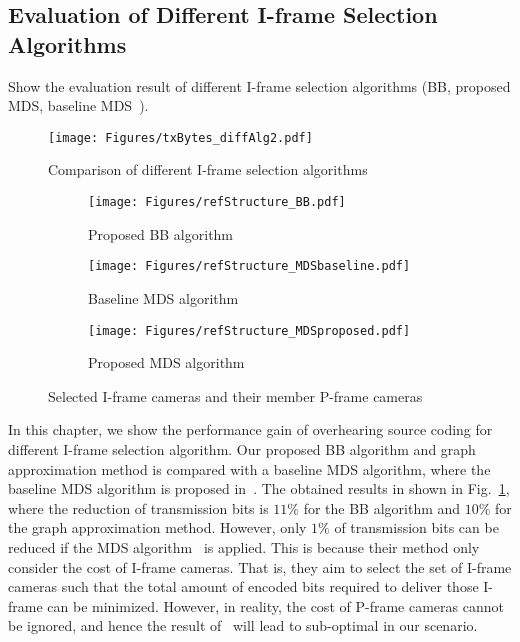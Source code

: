 \subsection{Evaluation of Different I-frame Selection Algorithms}
{\color{red}Show the evaluation result of different I-frame selection algorithms (BB, proposed MDS, baseline MDS~\cite{MWDS_baseline}).}
%
\begin{figure}
\begin{center}
\texttt{[image: Figures/txBytes\_diffAlg2.pdf]}
\caption{\label{fig::txBytes_diffAlg} Comparison of different I-frame selection algorithms}
\end{center}
\end{figure}
%
\begin{figure}
\begin{center}
%
\begin{subfigure}[b]{\columnwidth}
\texttt{[image: Figures/refStructure\_BB.pdf]}
\caption{\label{fig::refStructure_BB} Proposed BB algorithm}
\end{subfigure}
%
\begin{subfigure}[b]{\columnwidth}
\texttt{[image: Figures/refStructure\_MDSbaseline.pdf]}
\caption{\label{fig::refStructure_MDSbaseline} Baseline MDS algorithm}
\end{subfigure}
%
\begin{subfigure}[b]{\columnwidth}
\texttt{[image: Figures/refStructure\_MDSproposed.pdf]}
\caption{\label{fig::refStructure_MDSproposed} Proposed MDS algorithm}
\end{subfigure}
%
\caption{\label{fig::refStructure_threeAlgs} Selected I-frame cameras and their member P-frame cameras}
\end{center}
\end{figure}
In this chapter, we show the performance gain of overhearing source coding for different I-frame selection algorithm.
Our proposed BB algorithm and graph approximation method is compared with a baseline MDS algorithm, where the baseline MDS algorithm is proposed in~\cite{MWDS_baseline}.
The obtained results in shown in Fig.~\ref{fig::txBytes_diffAlg}, where the reduction of transmission bits is $11\%$ for the BB algorithm and $10\%$ for the graph approximation method.
However, only $1\%$ of transmission bits can be reduced if the MDS algorithm~\cite{MWDS_baseline} is applied.
This is because their method only consider the cost of I-frame cameras.
That is, they aim to select the set of I-frame cameras such that the total amount of encoded bits required to deliver those I-frame can be minimized.
However, in reality, the cost of P-frame cameras cannot be ignored, and hence the result of~\cite{MWDS_baseline} will lead to sub-optimal in our scenario.

